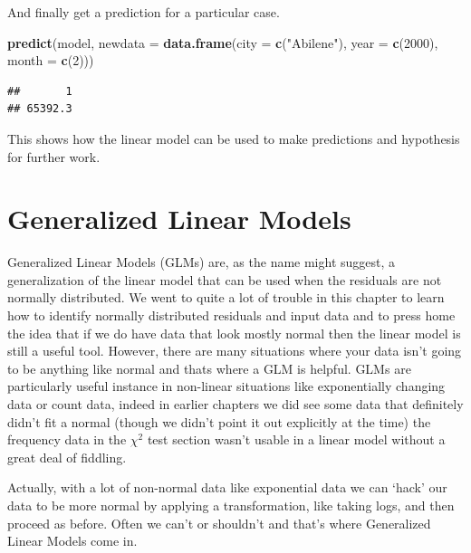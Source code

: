 \documentclass[
]{book}
\newenvironment{Shaded}{\begin{snugshade}}{\end{snugshade}}
\newcommand{\DataTypeTok}[1]{\textcolor[rgb]{0.13,0.29,0.53}{#1}}
\newcommand{\DecValTok}[1]{\textcolor[rgb]{0.00,0.00,0.81}{#1}}
\newcommand{\KeywordTok}[1]{\textcolor[rgb]{0.13,0.29,0.53}{\textbf{#1}}}
\newcommand{\NormalTok}[1]{#1}
\newcommand{\StringTok}[1]{\textcolor[rgb]{0.31,0.60,0.02}{#1}}
\newenvironment{sidenote}
{ \begin{tcolorbox}[colbacktitle=blue!50!white,
title=huh?,coltitle=white,
fonttitle=\bfseries] }
{  \end{tcolorbox} }
\begin{document}
And finally get a prediction for a particular case.

\begin{Shaded}
\begin{Highlighting}[]
\KeywordTok{predict}\NormalTok{(model, }\DataTypeTok{newdata =} \KeywordTok{data.frame}\NormalTok{(}\DataTypeTok{city =} \KeywordTok{c}\NormalTok{(}\StringTok{"Abilene"}\NormalTok{), }\DataTypeTok{year =} \KeywordTok{c}\NormalTok{(}\DecValTok{2000}\NormalTok{), }\DataTypeTok{month =} \KeywordTok{c}\NormalTok{(}\DecValTok{2}\NormalTok{)))}
\end{Highlighting}
\end{Shaded}

\begin{verbatim}
##       1 
## 65392.3
\end{verbatim}

This shows how the linear model can be used to make predictions and hypothesis for further work.

\hypertarget{generalized-linear-models}{%
\section{Generalized Linear Models}\label{generalized-linear-models}}

Generalized Linear Models (GLMs) are, as the name might suggest, a generalization of the linear model that can be used when the residuals are not normally distributed. We went to quite a lot of trouble in this chapter to learn how to identify normally distributed residuals and input data and to press home the idea that if we do have data that look mostly normal then the linear model is still a useful tool. However, there are many situations where your data isn't going to be anything like normal and thats where a GLM is helpful. GLMs are particularly useful instance in non-linear situations like exponentially changing data or count data, indeed in earlier chapters we did see some data that definitely didn't fit a normal (though we didn't point it out explicitly at the time) the frequency data in the \(\chi^2\) test section wasn't usable in a linear model without a great deal of fiddling.

\begin{sidenote}
Actually, with a lot of non-normal data like exponential data we can `hack' our data to be more normal by applying a transformation, like taking logs, and then proceed as before. Often we can't or shouldn't and that's where Generalized Linear Models come in.
\end{sidenote}
\end{document}
